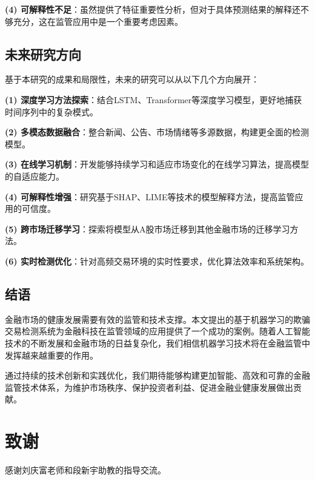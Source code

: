 \documentclass[12pt,a4paper]{article}
\begin{document}
\textbf{(4) 可解释性不足}：虽然提供了特征重要性分析，但对于具体预测结果的解释还不够充分，这在监管应用中是一个重要考虑因素。

\subsection{未来研究方向}

基于本研究的成果和局限性，未来的研究可以从以下几个方向展开：

\textbf{(1) 深度学习方法探索}：结合LSTM、Transformer等深度学习模型，更好地捕获时间序列中的复杂模式。

\textbf{(2) 多模态数据融合}：整合新闻、公告、市场情绪等多源数据，构建更全面的检测模型。

\textbf{(3) 在线学习机制}：开发能够持续学习和适应市场变化的在线学习算法，提高模型的自适应能力。

\textbf{(4) 可解释性增强}：研究基于SHAP、LIME等技术的模型解释方法，提高监管应用的可信度。

\textbf{(5) 跨市场迁移学习}：探索将模型从A股市场迁移到其他金融市场的迁移学习方法。

\textbf{(6) 实时检测优化}：针对高频交易环境的实时性要求，优化算法效率和系统架构。

\subsection{结语}

金融市场的健康发展需要有效的监管和技术支撑。本文提出的基于机器学习的欺骗交易检测系统为金融科技在监管领域的应用提供了一个成功的案例。随着人工智能技术的不断发展和金融市场的日益复杂化，我们相信机器学习技术将在金融监管中发挥越来越重要的作用。

通过持续的技术创新和实践优化，我们期待能够构建更加智能、高效和可靠的金融监管技术体系，为维护市场秩序、保护投资者利益、促进金融业健康发展做出贡献。

\section*{致谢}

感谢刘庆富老师和段新宇助教的指导交流。
\end{document}
